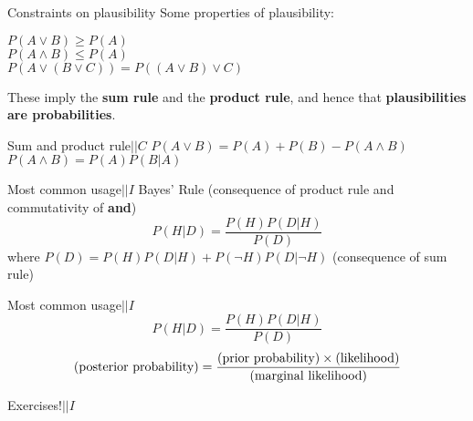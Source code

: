 \documentclass{beamer}
\begin{document}
\begin{frame}[t]{Constraints on plausibility}
Some properties of plausibility:\vspace{20pt}

$P(A \vee B) \geq P(A)$\\
$P(A \wedge B) \leq P(A)$\\
$P(A \vee (B \vee C)) = P((A \vee B) \vee C)$\vspace{20pt}

These imply the {\bf sum rule} and the {\bf product rule}, and hence that
{\bf plausibilities are probabilities}.
\end{frame}

\begin{frame}[t]{Sum and product rule\hspace{170pt}$|| C$}
$P(A \vee B) = P(A) + P(B) - P(A \wedge B)$\\
\vspace{20pt}
$P(A \wedge B) = P(A)P(B|A)$
\end{frame}

\begin{frame}[t]{Most common usage\hspace{170pt}$|| I$}
Bayes' Rule (consequence of product rule and commutativity of {\bf and})
\begin{equation}
P(H | D) = \frac{P(H)P(D|H)}{P(D)}
\end{equation}
where\vspace{20pt}
$P(D) = P(H)P(D | H) + P(\neg H)P(D | \neg H)$
(consequence of sum rule)
\end{frame}

\begin{frame}[t]{Most common usage\hspace{170pt}$|| I$}
\begin{equation}
P(H | D) = \frac{P(H)P(D|H)}{P(D)}
\end{equation}
\begin{equation}
\textnormal{(posterior probability)} =
\frac{\textnormal{(prior probability)}\times\textnormal{(likelihood)}}{\textnormal{(marginal likelihood)}}
\end{equation}
\end{frame}

\begin{frame}[t]{Exercises!\hspace{170pt}$|| I$}
\end{frame}
\end{document}
